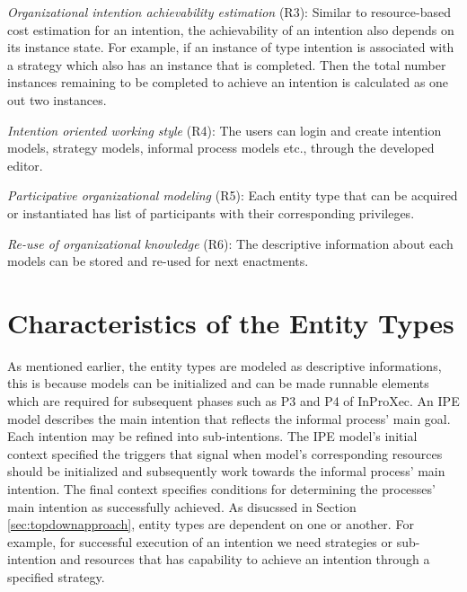 \textit{Organizational intention achievability estimation} (R3): Similar to resource-based cost estimation for an intention, the achievability of an intention also depends on its instance state. For example, if an instance of type intention is associated with a strategy which also has an instance that is completed. Then the total number instances remaining to be completed to achieve an intention is calculated as one out two instances. 

\textit{Intention oriented working style} (R4): The users can login and create intention models, strategy models, informal process models etc., through the developed editor. 

\textit{Participative organizational modeling} (R5): Each entity type that can be acquired or instantiated has list of participants with their corresponding privileges. 

\textit{Re-use of organizational knowledge} (R6): The descriptive information about each models can be stored and re-used for next enactments. 
 
\section{Characteristics of the Entity Types}
\label{sec:enttyperelation}
As mentioned earlier, the entity types are modeled as descriptive informations, this is because models can be initialized and can be made runnable elements which are required for subsequent phases such as P3 and P4 of InProXec. An IPE model describes the main intention that reflects the informal process' main goal. Each intention may be refined into sub-intentions. The IPE model's initial context specified the triggers that signal when model's corresponding resources should be initialized and subsequently work towards the informal process' main intention\cite{Sungur2015a}. The final context specifies conditions for determining the processes' main intention as successfully achieved. As disucssed in Section \ref{sec:topdownapproach}, entity types are dependent on one or another. For example, for successful execution of an intention we need strategies or sub-intention and resources that has capability to achieve an intention through a specified strategy. 

